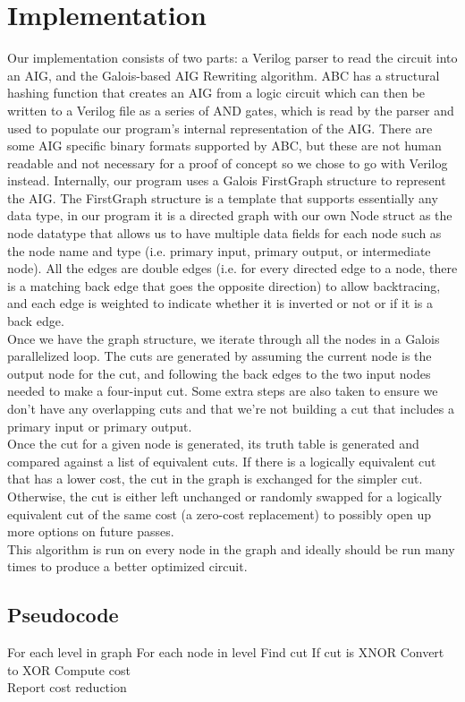 \documentclass[twocolumn]{article}
\begin{document}
\section{Implementation}
Our implementation consists of two parts: a Verilog parser to read the circuit into an AIG, and the Galois-based AIG Rewriting algorithm. ABC has a structural hashing function that creates an AIG from a logic circuit which can then be written to a Verilog file as a series of AND gates, which is read by the parser and used to populate our program's internal representation of the AIG.  There are some AIG specific binary formats supported by ABC, but these are not human readable and not necessary for a proof of concept so we chose to go with Verilog instead.\newline\indent
Internally, our program uses a Galois FirstGraph structure to represent the AIG. The FirstGraph structure is a template that supports essentially any data type, in our program it is a directed graph with our own Node struct as the node datatype that allows us to have multiple data fields for each node such as the node name and type (i.e. primary input, primary output, or intermediate node).  All the edges are double edges (i.e. for every directed edge to a node, there is a matching back edge that goes the opposite direction) to allow backtracing, and each edge is weighted to indicate whether it is inverted or not or if it is a back edge.\\\indent
Once we have the graph structure, we iterate through all the nodes in a Galois parallelized loop. The cuts are generated by assuming the current node is the output node for the cut, and following the back edges to the two input nodes needed to make a four-input cut.  Some extra steps are also taken to ensure we don't have any overlapping cuts and that we're not building a cut that includes a primary input or primary output.\\\indent
Once the cut for a given node is generated, its truth table is generated and compared against a list of equivalent cuts. If there is a logically equivalent cut that has a lower cost, the cut in the graph is exchanged for the simpler cut. Otherwise, the cut is either left unchanged or randomly swapped for a logically equivalent cut of the same cost (a zero-cost replacement) to possibly open up more options on future passes.\\\indent
This algorithm is run on every node in the graph and ideally should be run many times to produce a better optimized circuit.
\subsection{Pseudocode}
For each level in graph\newline\indent
For each node in level\newline\indent\indent
Find cut\newline\indent\indent
If cut is XNOR\newline\indent\indent\indent
Convert to XOR\newline\indent\indent\indent
Compute cost\\
Report cost reduction
\end{document}
